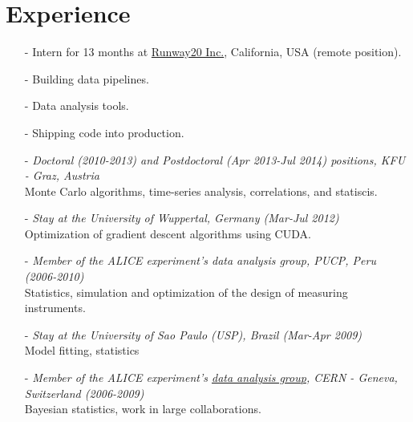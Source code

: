 \documentclass[a4paper, 10pt]{article}
\begin{document}
\vspace*{2mm}
\section{Experience}
\vspace*{2mm}
\vspace*{-1mm}
\begin{itemize}
    \item[-] Intern for 13 months at \href{http://www.weldai.com/}{Runway20 Inc.}, California, USA (remote position).\vspace*{-2mm}
    \item[-] Building data pipelines.\vspace*{-2mm}
    \item[-] Data analysis tools.\vspace*{-2mm}
    \item[-] Shipping code into production.\vspace*{-2mm}
\end{itemize}

\vspace*{2mm}
\vspace*{-1mm}
\begin{itemize}
    \item[-] {\it Doctoral (2010-2013) and Postdoctoral (Apr 2013-Jul 2014) positions, KFU - Graz, Austria}
              \\Monte Carlo algorithms, time-series analysis, correlations, and statiscis.\vspace*{-1mm}
    \item[-] {\it Stay at the University of Wuppertal, Germany (Mar-Jul 2012)}
              \\Optimization of gradient descent algorithms using CUDA.\vspace*{-1mm}
    \item[-] {\it Member of the ALICE experiment's data analysis group,  PUCP, Peru (2006-2010)}
              \\Statistics, simulation and optimization of the design of measuring instruments.
    \item[-] {\it Stay at the University of Sao Paulo (USP), Brazil (Mar-Apr 2009)}
              \\Model fitting, statistics\vspace*{-1mm}
    \item[-] {\it Member of the ALICE experiment's \href{http://aliweb.cern.ch/Offline/}{data analysis group}, CERN - 
              Geneva, Switzerland (2006-2009)}
              \\Bayesian statistics, work in large collaborations.
\end{itemize}
\end{document}
